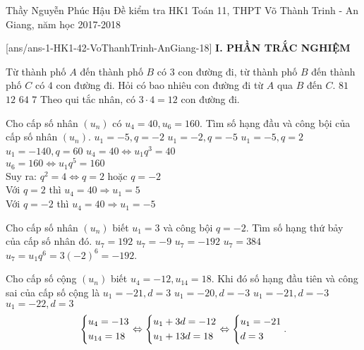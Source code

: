 \begin{name}
{Thầy Nguyễn Phúc Hậu}
{Đề kiểm tra HK1 Toán 11, THPT Võ Thành Trinh - An Giang, năm học 2017-2018}
\end{name}
\setcounter{ex}{0}\setcounter{bt}{0}
[ans/ans-1-HK1-42-VoThanhTrinh-AnGiang-18]
\noindent\textbf{I. PHẦN TRẮC NGHIỆM}
\begin{ex}%
 Từ thành phố $A$ đến thành phố $B$ có $3$ con đường đi, từ thành phố $B$ đến thành phố $C$ có $4$ con đường đi. Hỏi có bao nhiêu con đường đi từ $A$ qua $B$ đến $C$.
 \choice
  {$81$}
  {\True $12$}
  {$64$}
  {$7$}
 \loigiai
{ Theo qui tắc nhân, có $3\cdot4=12$ con đường đi.}
 \end{ex}

\begin{ex}%
 Cho cấp số nhân $(u_n)$ có $u_4=40,u_6=160$. Tìm số hạng đầu và công bội của cấp số nhân $(u_n)$.
 \choice
  {\True $u_1=-5,q=-2$}
  {$u_1=-2,q=-5$}
  {$u_1=-5,q=2$}
  {$u_1=-140,q=60$}
 \loigiai
 {
 $u_4=40\Leftrightarrow u_1q^3=40$\\
 $u_6=160\Leftrightarrow u_1q^5=160$\\
 Suy ra: $q^2=4\Leftrightarrow q=2$ hoặc $q=-2$\\
 Với $q=2$ thì $u_4=40 \Rightarrow u_1=5$\\
 Với $q=-2$ thì $u_4=40 \Rightarrow u_1=-5$
 }
 \end{ex}

\begin{ex}%
 Cho cấp số nhân $(u_n)$ biết $u_1=3$ và công bội $q=-2$. Tìm số hạng thứ bảy của cấp số nhân đó.
 \choice
  {\True $u_7=192$}
  {$u_7=-9$}
  {$u_7=-192$}
  {$u_7=384$}
 \loigiai
 {
 $u_7=u_1q^6=3(-2)^6=-192$.
 }
\end{ex}

\begin{ex}%
 Cho cấp số cộng $(u_n)$ biết $u_4=-12,u_{14}=18$. Khi đó số hạng đầu tiên và công sai của cấp số cộng là
 \choice
  {\True $u_1=-21,d=3$}
  {$u_1=-20,d=-3$}
  {$u_1=-21,d=-3$}
  {$u_1=-22,d=3$}
 \loigiai
 {
 $$\left\{\begin{aligned}& u_4=-13 \\& u_{14}=18\end{aligned}\right. \Leftrightarrow \left\{\begin{aligned}& u_1+3d=-12 \\& u_1+13d=18\end{aligned}\right. \Leftrightarrow \left\{\begin{aligned}& u_1 = -21 \\& d=3\end{aligned}\right..$$
 }
\end{ex}

